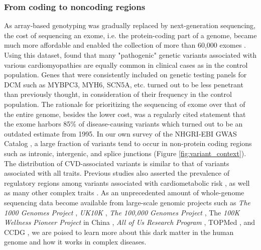 \documentclass[letter]{bioinfo}
\begin{document}
\subsubsection*{From coding to noncoding regions}	
	As array-based genotyping was gradually replaced by next-generation sequencing, the cost of sequencing an exome, i.e. the protein-coding part of a genome, became much more affordable and enabled the collection of more than 60,000 exomes \citep{Lek:2016:Analysis}. Using this dataset, \cite{Walsh:2017:Reassessment} found that many "pathogenic" genetic variants associated with various cardiomyopathies are equally common in clinical cases as in the control population. Genes that were consistently included on genetic testing panels for DCM such as MYBPC3, MYH6, SCN5A, etc. turned out to be less penetrant than previously thought, in consideration of their frequency in the control population. The rationale for prioritizing the sequencing of exome over that of the entire genome, besides the lower cost, was a regularly cited statement that the exome harbors 85\% of disease-causing variants \citep{Antonarakis:2001:nature} which turned out to be an outdated estimate from 1995. In our own survey of the NHGRI-EBI GWAS Catalog \citep{MacArthur:2017:new}, a large fraction of variants tend to occur in non-protein coding regions such as intronic, intergenic, and splice junctions (Figure \ref{fig:variant_context}). The distribution of CVD-associated variants is similar to that of variants associated with all traits. Previous studies also asserted the prevalence of regulatory regions among variants associated with cardiometabolic risk \citep{Franzen:2016:Cardiometabolic}, as well as many other complex traits \citep{Pickrell:2014:Joint}. As an unprecedented amount of whole-genome sequencing data become available from large-scale genomic projects such as \textit{The 1000 Genomes Project} \citep{1000G:2015:global}, \textit{UK10K} \citep{TheUK10KConsortium:2015:UK10K}, \textit{The 100,000 Genomes Project} \citep{Caulfield:2017:100K}, The \textit{100K Wellness Pioneer Project} in China \citep{Kalia:2017:China}, \textit{All of Us Research Program} \citep{NIH:2018:All}, TOPMed \citep{NHLBI:2014:TransOmics}, and CCDG \citep{NHGRI:2016:CCDG}, we are poised to learn more about this dark matter in the human genome and how it works in complex diseases.
\end{document}
